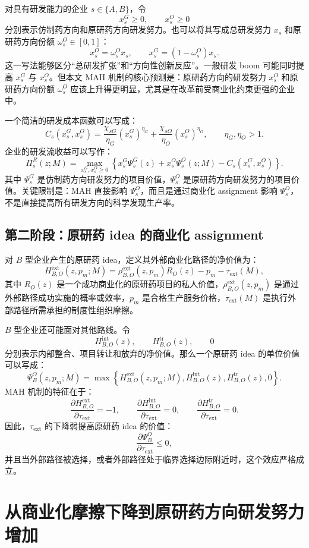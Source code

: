 \documentclass[12pt]{article}
\newcommand{\tauext}{\tau_{\mathrm{ext}}}
\begin{document}
对具有研发能力的企业 $s\in\{A,B\}$，令
\[
x_s^G\geq 0, \qquad x_s^O\geq 0
\]
分别表示仿制药方向和原研药方向研发努力。也可以将其写成总研发努力 $x_s$ 和原研药方向份额 $\omega_s^O\in[0,1]$：
\[
x_s^O=\omega_s^O x_s,\qquad x_s^G=(1-\omega_s^O)x_s.
\]
这一写法能够区分“总研发扩张”和“方向性创新反应”。一般研发 boom 可能同时提高 $x_s^G$ 与 $x_s^O$。但本文 MAH 机制的核心预测是：原研药方向的研发努力 $x_s^O$ 和原研药方向份额 $\omega_s^O$ 应该上升得更明显，尤其是在改革前受商业化约束更强的企业中。

一个简洁的研发成本函数可以写成：
\[
C_s(x_s^G,x_s^O)=\frac{\chi_{sG}}{\eta_G}(x_s^G)^{\eta_G}+\frac{\chi_{sO}}{\eta_O}(x_s^O)^{\eta_O},
\qquad \eta_G,\eta_O>1.
\]
企业的研发流收益可以写作：
\[
\Pi_s^{R}(z;M)=\max_{x_s^G,x_s^O\geq0}
\left\{x_s^G \Psi_s^G(z)+x_s^O\Psi_s^O(z;M)-C_s(x_s^G,x_s^O)\right\}.
\]
其中 $\Psi_s^G$ 是仿制药方向研发努力的项目价值，$\Psi_s^O$ 是原研药方向研发努力的项目价值。关键限制是：MAH 直接影响 $\Psi_s^O$，而且是通过商业化 assignment 影响 $\Psi_s^O$，不是直接提高所有研发方向的科学发现生产率。

\subsection{第二阶段：原研药 idea 的商业化 assignment}

对 $B$ 型企业产生的原研药 idea，定义其外部商业化路径的净价值为：
\[
H_{B,O}^{\mathrm{ext}}(z,p_m;M)
=\rho_{B,O}^{\mathrm{ext}}(z,p_m)R_O(z)-p_m-\tauext(M),
\]
其中 $R_O(z)$ 是一个成功商业化的原研药项目的私人价值，$\rho_{B,O}^{\mathrm{ext}}(z,p_m)$ 是通过外部路径成功实施的概率或效率，$p_m$ 是合格生产服务价格，$\tauext(M)$ 是执行外部路径所需承担的制度性组织摩擦。

$B$ 型企业还可能面对其他路线。令
\[
H_{B,O}^{\mathrm{int}}(z),\qquad H_{B,O}^{\mathrm{tr}}(z),\qquad 0
\]
分别表示内部整合、项目转让和放弃的净价值。那么一个原研药 idea 的单位价值可以写成：
\[
\Psi_B^O(z,p_m;M)=\max\left\{
H_{B,O}^{\mathrm{ext}}(z,p_m;M),
H_{B,O}^{\mathrm{int}}(z),
H_{B,O}^{\mathrm{tr}}(z),
0
\right\}.
\]
MAH 机制的特征在于：
\[
\frac{\partial H_{B,O}^{\mathrm{ext}}}{\partial \tauext}=-1,
\qquad
\frac{\partial H_{B,O}^{\mathrm{int}}}{\partial \tauext}=0,
\qquad
\frac{\partial H_{B,O}^{\mathrm{tr}}}{\partial \tauext}=0.
\]
因此，$\tauext$ 的下降弱提高原研药 idea 的价值：
\[
\frac{\partial \Psi_B^O}{\partial \tauext}\leq 0,
\]
并且当外部路径被选择，或者外部路径处于临界选择边际附近时，这个效应严格成立。

\section{从商业化摩擦下降到原研药方向研发努力增加}
\end{document}
